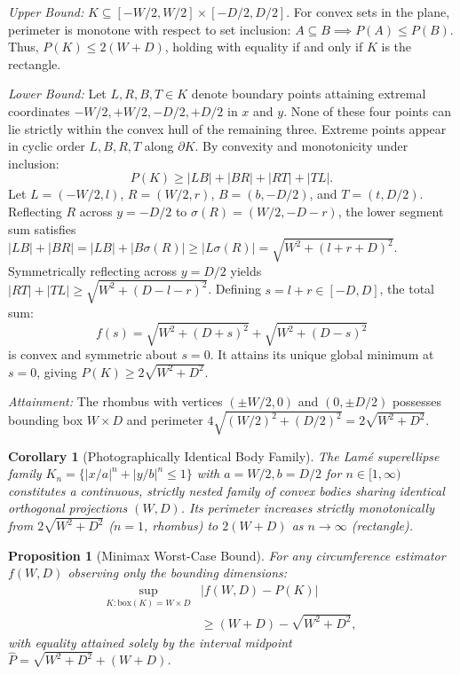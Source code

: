 \documentclass[journal]{IEEEtran}
\newtheorem{corollary}[theorem]{Corollary}
\newtheorem{proposition}[theorem]{Proposition}
\begin{document}
\begin{IEEEproof}
\textit{Upper Bound:} $K \subseteq [-W/2, W/2] \times [-D/2, D/2]$. For convex sets in the plane, perimeter is monotone with respect to set inclusion: $A \subseteq B \implies P(A) \le P(B)$. Thus, $P(K) \le 2(W+D)$, holding with equality if and only if $K$ is the rectangle.

\textit{Lower Bound:} Let $L, R, B, T \in K$ denote boundary points attaining extremal coordinates $-W/2, +W/2, -D/2, +D/2$ in $x$ and $y$. None of these four points can lie strictly within the convex hull of the remaining three. Extreme points appear in cyclic order $L, B, R, T$ along $\partial K$. By convexity and monotonicity under inclusion:
\begin{equation}
P(K) \ge |LB| + |BR| + |RT| + |TL|.
\end{equation}
Let $L = (-W/2, l)$, $R = (W/2, r)$, $B = (b, -D/2)$, and $T = (t, D/2)$. Reflecting $R$ across $y = -D/2$ to $\sigma(R) = (W/2, -D-r)$, the lower segment sum satisfies $|LB| + |BR| = |LB| + |B\sigma(R)| \ge |L\sigma(R)| = \sqrt{W^2 + (l+r+D)^2}$. Symmetrically reflecting across $y = D/2$ yields $|RT| + |TL| \ge \sqrt{W^2 + (D - l - r)^2}$. Defining $s = l + r \in [-D, D]$, the total sum:
\begin{equation}
f(s) = \sqrt{W^2 + (D+s)^2} + \sqrt{W^2 + (D-s)^2}
\end{equation}
is convex and symmetric about $s=0$. It attains its unique global minimum at $s=0$, giving $P(K) \ge 2\sqrt{W^2+D^2}$.

\textit{Attainment:} The rhombus with vertices $(\pm W/2, 0)$ and $(0, \pm D/2)$ possesses bounding box $W \times D$ and perimeter $4\sqrt{(W/2)^2 + (D/2)^2} = 2\sqrt{W^2+D^2}$.
\end{IEEEproof}

\begin{corollary}[Photographically Identical Body Family]
\label{cor:lame_family}
The Lam\'{e} superellipse family $K_n = \{ |x/a|^n + |y/b|^n \le 1 \}$ with $a=W/2, b=D/2$ for $n \in [1, \infty)$ constitutes a continuous, strictly nested family of convex bodies sharing identical orthogonal projections $(W, D)$. Its perimeter increases strictly monotonically from $2\sqrt{W^2+D^2}$ ($n=1$, rhombus) to $2(W+D)$ as $n \to \infty$ (rectangle).
\end{corollary}

\begin{proposition}[Minimax Worst-Case Bound]
\label{prop:minimax}
For any circumference estimator $f(W, D)$ observing only the bounding dimensions:
\begin{equation}
\begin{aligned}
\sup_{K : \text{box}(K) = W \times D} &|f(W, D) - P(K)| \\
&\ge (W + D) - \sqrt{W^2 + D^2},
\end{aligned}
\label{eq:minimax}
\end{equation}
with equality attained solely by the interval midpoint $\hat{P} = \sqrt{W^2+D^2} + (W+D)$.
\end{proposition}
\end{document}
